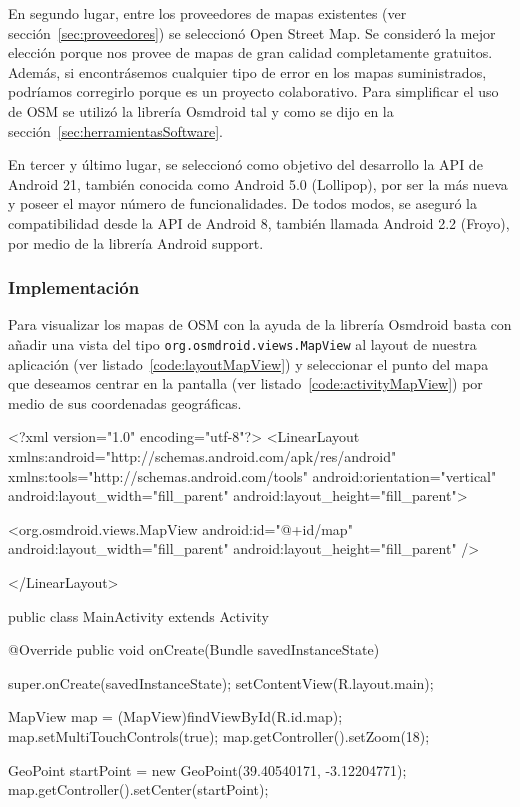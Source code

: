 En segundo lugar, entre los proveedores de mapas existentes (ver sección~\ref{sec:proveedores}) se
seleccionó Open Street Map. Se consideró la mejor elección porque nos provee de mapas de gran
calidad completamente gratuitos. Además, si encontrásemos cualquier tipo de error en los mapas
suministrados, podríamos corregirlo porque es un proyecto colaborativo. Para simplificar el uso de
\acs{OSM} se utilizó la librería Osmdroid tal y como se dijo en la
sección~\ref{sec:herramientasSoftware}.

En tercer y último lugar, se seleccionó como objetivo del desarrollo la \acs{API} de Android 21,
también conocida como Android 5.0 (Lollipop), por ser la más nueva y poseer el mayor número de
funcionalidades. De todos modos, se aseguró la compatibilidad desde la \acs{API} de Android 8,
también llamada Android 2.2 (Froyo), por medio de la librería Android support.

\subsubsection{Implementación}

Para visualizar los mapas de \acs{OSM} con la ayuda de la librería Osmdroid basta con añadir una
vista del tipo \texttt{org.osmdroid.views.MapView} al layout de nuestra aplicación (ver
listado~\ref{code:layoutMapView}) y seleccionar el punto del mapa que deseamos centrar en la
pantalla (ver listado~\ref{code:activityMapView}) por medio de sus coordenadas geográficas.

\begin{listing}[
  float=ht,
  language = xml,
  caption  = {Ejemplo de layout usando \texttt{org.osmdroid.views.MapView}},
  label    = code:layoutMapView]
<?xml version="1.0" encoding="utf-8"?>
<LinearLayout xmlns:android="http://schemas.android.com/apk/res/android"
        xmlns:tools="http://schemas.android.com/tools"
        android:orientation="vertical" 
        android:layout_width="fill_parent"
        android:layout_height="fill_parent">
        
        <org.osmdroid.views.MapView android:id="@+id/map"
                android:layout_width="fill_parent" 
                android:layout_height="fill_parent" />
                
</LinearLayout>
\end{listing}

\begin{listing}[
  float=ht,
  language = java,
  caption  = {Ejemplo de activity mostrando un punto de un mapa en específico},
  label    = code:activityMapView]
public class MainActivity extends Activity {
    @Override public void onCreate(Bundle savedInstanceState) {
        super.onCreate(savedInstanceState);
        setContentView(R.layout.main);

        MapView map = (MapView)findViewById(R.id.map);
        map.setMultiTouchControls(true);
        map.getController().setZoom(18);

        GeoPoint startPoint = new GeoPoint(39.40540171, -3.12204771);
        map.getController().setCenter(startPoint);
    }
}
\end{listing}

